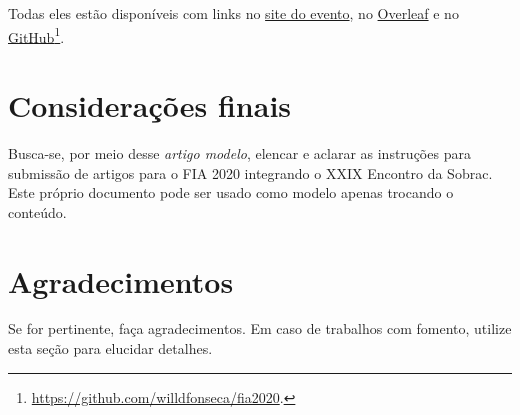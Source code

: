 \documentclass[12pt, a4paper, twoside, twocolumn]{article}
\begin{document}

Todas eles estão disponíveis com links no \href{http://fia2020.com.br}{site do evento}, no \href{https://www.overleaf.com/read/rnfjxkknksnd}{Overleaf} e no \href{https://github.com/willdfonseca/fia2020}{GitHub}\footnote{\url{https://github.com/willdfonseca/fia2020}.}.

\section{Considerações finais}

Busca-se, por meio desse \textit{artigo modelo}, elencar e aclarar as instruções para submissão de artigos para o FIA 2020 integrando o XXIX Encontro da Sobrac. 
Este próprio documento pode ser usado como modelo apenas trocando o conteúdo.

\section{Agradecimentos}

Se for pertinente, faça agradecimentos.
%
Em caso de trabalhos com fomento, utilize esta seção para elucidar detalhes.
\end{document}
